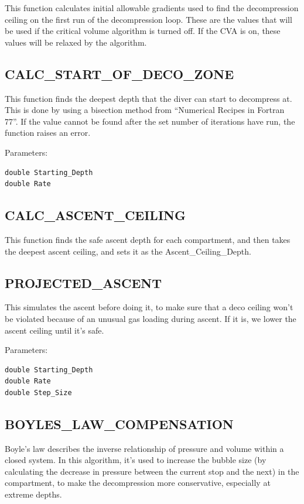 \documentclass[12pt]{article}
\begin{document}
This function calculates initial allowable gradients used to find the decompression
ceiling on the first run of the decompression loop. These are the values that will
be used if the critical volume algorithm is turned off. If the CVA is on, these
values will be relaxed by the algorithm.


\subsection{CALC\_START\_OF\_DECO\_ZONE}

This function finds the deepest depth that the diver can start to
decompress at. This is done by using a bisection method from 
``Numerical Recipes in Fortran 77''. If the value cannot be found 
after the set number of iterations have run, the function raises an error.


Parameters:
\begin{verbatim}
double Starting_Depth
double Rate
\end{verbatim}

\subsection{CALC\_ASCENT\_CEILING}

This function finds the safe ascent depth for each compartment, and then takes the deepest ascent ceiling, and sets
it as the Ascent\_Ceiling\_Depth.

\subsection{PROJECTED\_ASCENT}

This simulates the ascent before doing it, to make sure that a deco ceiling won't be violated because of
an unusual gas loading during ascent. If it is, we lower the ascent ceiling until it's safe.


Parameters:
\begin{verbatim}
double Starting_Depth
double Rate
double Step_Size
\end{verbatim}


\subsection{BOYLES\_LAW\_COMPENSATION}

Boyle's law describes the inverse relationship
of pressure and volume within a closed system\cite{Giancoli05}. In this algorithm, it's used to increase the bubble size (by calculating the decrease in pressure between the current stop and the next)
in the compartment, to make the decompression more conservative, especially at extreme depths.
\end{document}

